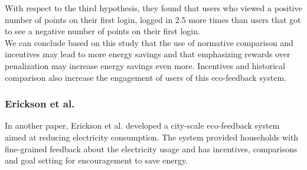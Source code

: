 \documentclass[journal]{vgtc}                %
\begin{document}
With respect to the third hypothesis, they found that users who viewed a positive number of points on their first login, logged in 2.5 more times than users that got to see a negative number of points on their first login. \\


We can conclude based on this study that the use of normative comparison and incentives may lead to more energy savings and that emphasizing rewards over penalization may increase energy savings even more. 
Incentives and historical comparison also increase the engagement of users of this eco-feedback system.\\

\subsubsection{Erickson et al.}
In another paper, Erickson et al. \cite{erickson2013dubuque} developed a city-scale eco-feedback system aimed at reducing electricity consumption. The system provided households with fine-grained feedback about the electricity usage and has incentives, comparisons and goal setting for encouragement to save energy. \\
\end{document}
